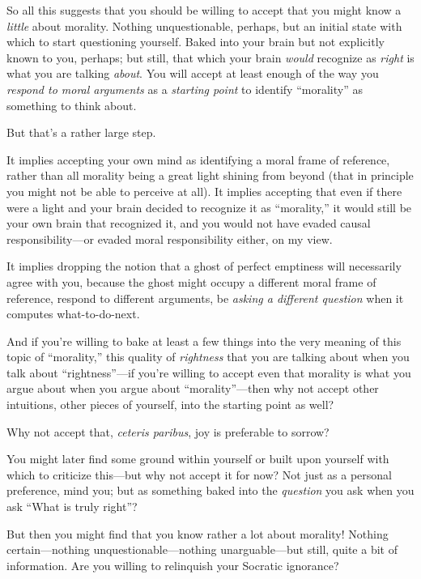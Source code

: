  So all this suggests that you should be willing to accept that you
might know a \textit{little} about morality. Nothing unquestionable,
perhaps, but an initial state with which to start questioning yourself.
Baked into your brain but not explicitly known to you, perhaps; but
still, that which your brain \textit{would} recognize as \textit{right}
is what you are talking \textit{about}. You will accept at least enough
of the way you \textit{respond to moral arguments} as a
\textit{starting point} to identify
``morality'' as something to think
about.


 But that's a rather large step.


 It implies accepting your own mind as identifying a moral frame of
reference, rather than all morality being a great light shining from
beyond (that in principle you might not be able to perceive at all). It
implies accepting that even if there were a light and your brain
decided to recognize it as
``morality,'' it would still be your
own brain that recognized it, and you would not have evaded causal
responsibility---or evaded moral responsibility either, on my view.


 It implies dropping the notion that a ghost of perfect emptiness
will necessarily agree with you, because the ghost might occupy a
different moral frame of reference, respond to different arguments, be
\textit{asking a different question} when it computes what-to-do-next.


 And if you're willing to bake at least a few
things into the very meaning of this topic of
``morality,'' this quality of
\textit{rightness} that you are talking about when you talk about
``rightness''---if
you're willing to accept even that morality is what you
argue about when you argue about
``morality''---then why not accept
other intuitions, other pieces of yourself, into the starting point as
well?


 Why not accept that, \textit{ceteris paribus}, joy is preferable
to sorrow?


 You might later find some ground within yourself or built upon
yourself with which to criticize this---but why not accept it for now?
Not just as a personal preference, mind you; but as something baked
into the \textit{question} you ask when you ask ``What
is truly right''?


 But then you might find that you know rather a lot about morality!
Nothing certain---nothing unquestionable---nothing unarguable---but
still, quite a bit of information. Are you willing to relinquish your
Socratic ignorance?


